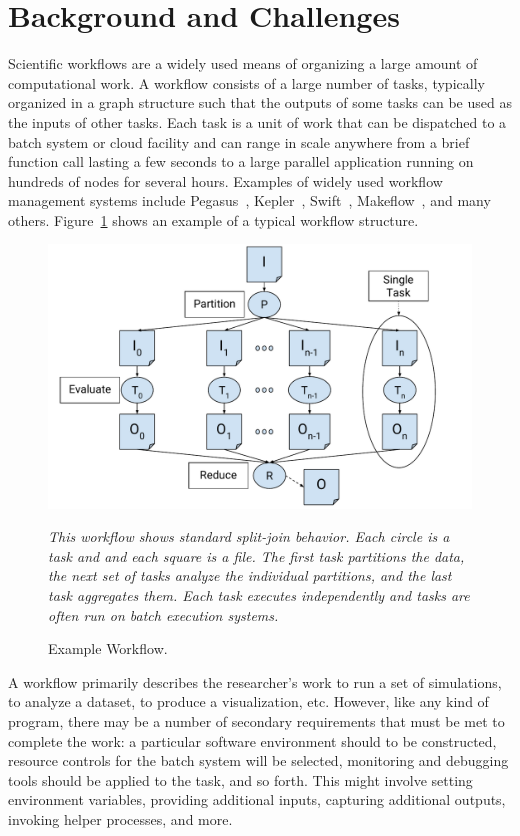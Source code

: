 \documentclass[conference]{IEEEtran}
\begin{document}
\section{Background and Challenges}

Scientific workflows are a widely used means of organizing
a large amount of computational work.  A workflow consists
of a large number of tasks, typically organized in a graph structure
such that the outputs of some tasks can be used as the inputs 
of other tasks.  Each task is a unit of work that can be dispatched
to a batch system or cloud facility and can range in scale anywhere
from a brief function call lasting a few seconds to a large parallel
application running on hundreds of nodes for several hours.
Examples of widely used workflow management systems include
Pegasus~\cite{pegasus}, 
Kepler~\cite{doi:10.1002-cpe.94}, 
Swift~\cite{swift}, 
Makeflow~\cite{makeflow-sweet12}, and many others. Figure~\ref{fig:workflow} shows an example of a typical
workflow structure.

\begin{figure}[t]
\includegraphics[width=\columnwidth]{graphics/example_workflow.pdf}
\caption{Example Workflow.}
\small
\emph{This workflow shows
standard split-join behavior. 
Each circle is a task and 
and each square is a file. 
The first task partitions the data, 
the next set of tasks analyze the individual partitions, 
and the last task aggregates them. 
Each task executes independently
and tasks are often run on batch execution systems.}
\label{fig:workflow}
\end{figure}


A workflow primarily describes the researcher's work
to run a set of simulations, 
to analyze a dataset, 
to produce a visualization, etc.
However, like any kind of program, there may be a number of secondary
requirements that must be met to complete the work:
a particular software environment should to be constructed,
resource controls for the batch system will be selected,
monitoring and debugging tools should be applied to the task,
and so forth.  This might involve  
setting environment variables,
providing additional inputs, capturing additional outputs,
invoking helper processes, and more.
\end{document}
